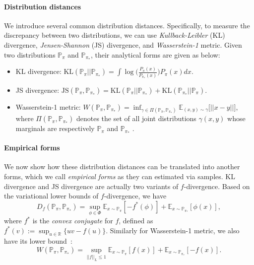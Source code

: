\paragraph{Distribution distances}
We introduce several common distribution distances. Specifically, to measure the discrepancy between two distributions, we can use \textit{Kullback-Leibler} (KL) divergence, \textit{Jensen-Shannon} (JS) divergence, and \textit{Wasserstein-1} metric. Given two distributions $\mathbb{P}_\pi$ and $\mathbb{P}_{\pi_*}$, their analytical forms are given as below:
\begin{itemize}
    \item KL divergence: 
    $\text{KL}(\mathbb{P}_\pi || \mathbb{P}_{\pi_*}) = \int \log\Big( \frac{P_\pi(x)}{P_{\pi_*}(x)} \Big) P_{\pi}(x) dx$.
    
    \item JS divergence:
    $\text{JS}(\mathbb{P}_{\pi}, \mathbb{P}_{\pi_*}) = \text{KL}(\mathbb{P}_\pi || \mathbb{P}_{\pi_*}) + \text{KL}(\mathbb{P}_{\pi_*} || \mathbb{P}_{\pi})$.
    
    \item Wasserstein-1 metric:
    $W(\mathbb{P}_{\pi}, \mathbb{P}_{\pi_*}) = \inf_{\gamma\in\Pi(\mathbb{P}_{\pi}, \mathbb{P}_{\pi_*})} \mathbb{E}_{(x, y)\sim\gamma}\big[ ||x-y|| \big]$, 
    where $\Pi(\mathbb{P}_{\pi}, \mathbb{P}_{\pi_*})$ denotes the set of all joint distributions $\gamma(x, y)$ whose marginals are respectively $\mathbb{P}_{\pi}$ and $\mathbb{P}_{\pi_*}$ .
\end{itemize}


\paragraph{Empirical forms} We now show how these distribution distances can be translated into another forms, which we call \textit{empirical forms} as they can estimated via samples. KL divergence and JS divergence are actually two variants of $f$-divergence. Based on the variational lower bounds of $f$-divergence\citep{nguyen2010estimating}, we have
\begin{equation*}
D_{f} (\mathbb{P}_{\pi}, \mathbb{P}_{\pi_*}) = \sup_{\phi\in \Phi} \mathbb{E}_{x\sim\mathbb{P}_\pi}[-f^*(\phi) ] + \mathbb{E}_{x\sim\mathbb{P}_{\pi_*}}[\phi(x)],
\end{equation*}
where $f^*$ is the \textit{convex conjugate} for $f$, defined as $f^*(v) := \sup_{u\in\mathbb{R}} \{ uv - f(u) \}$. Similarly for Wasserstein-1 metric, we also have its lower bound~\citep{villani2008optimal}:
\begin{equation*}
W(\mathbb{P}_{\pi}, \mathbb{P}_{\pi_*}) = \sup_{||f||_{L}\leq 1} \mathbb{E}_{x\sim\mathbb{P}_\pi}[f(x)] + \mathbb{E}_{x\sim\mathbb{P}_{\pi_*}}[-f(x)].
\end{equation*}

